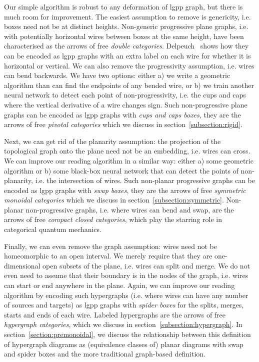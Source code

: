 Our simple algorithm is robust to any deformation of lgpp graph, but there is much room for improvement.
The easiest assumption to remove is genericity, i.e. boxes need not be at distinct heights.
Non-generic progressive plane graphs, i.e. with potentially horizontal wires between boxes at the same height, have been characterised as the arrows of free \emph{double categories}.
Delpeuch~\cite{Delpeuch20} shows how they can be encoded as lgpp graphs with an extra label on each wire for whether it is horizontal or vertical.
We can also remove the progressivity assumption, i.e. wires can bend backwards.
We have two options: either a) we write a geometric algorithm than can find the endpoints of any bended wire, or b) we train another neural network to detect each point of non-progressivity, i.e. the cups and caps where the vertical derivative of a wire changes sign.
Such non-progressive plane graphs can be encoded as lgpp graphs with \emph{cups and caps boxes}, they are the arrows of free \emph{pivotal categories} which we discuss in section~\ref{subsection:rigid}.

Next, we can get rid of the planarity assumption: the projection of the topological graph onto the plane need not be an embedding, i.e. wires can cross.
We can improve our reading algorithm in a similar way: either a) some geometric algorithm or b) some black-box neural network that can detect the points of non-planarity, i.e. the intersection of wires.
Such non-planar progressive graphs can be encoded as lgpp graphs with \emph{swap boxes}, they are the arrows of free \emph{symmetric monoidal categories} which we discuss in section~\ref{subsection:symmetric}.
Non-planar non-progressive graphs, i.e. where wires can bend and swap, are the arrows of free \emph{compact closed categories}, which play the starring role in categorical quantum mechanics.

Finally, we can even remove the graph assumption: wires need not be homeomorphic to an open interval.
We merely require that they are one-dimensional open subsets of the plane, i.e. wires can split and merge.
We do not even need to assume that their boundary is in the nodes of the graph, i.e. wires can start or end anywhere in the plane.
Again, we can improve our reading algorithm by encoding such hypergraphs (i.e. where wires can have any number of sources and targets) as lgpp graphs with \emph{spider boxes} for the splits, merges, starts and ends of each wire.
Labeled hypergraphs are the arrows of free \emph{hypergraph categories}, which we discuss in section~\ref{subsection:hypergraph}.
In section~\ref{section:premonoidal}, we discuss the relationship between this definition of hypergraph diagrams as (equivalence classes of) planar diagrams with swap and spider boxes and the more traditional graph-based definition.
